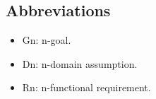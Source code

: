 \subsection{Abbreviations}
	\begin{itemize}
   	\item Gn: n-goal. 
   	\item Dn: n-domain assumption.
   	\item Rn: n-functional requirement. 
	\end{itemize}
